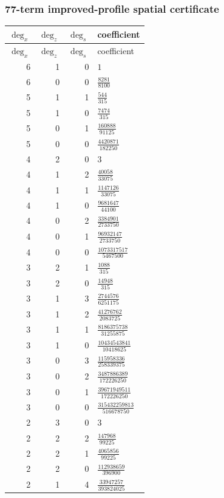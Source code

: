\subsubsection*{77-term improved-profile spatial certificate}
\begin{longtable}{rrrl}
$\deg_{x}$ & $\deg_{z}$ & $\deg_{s}$ & coefficient\\
\toprule
\endfirsthead
$\deg_{x}$ & $\deg_{z}$ & $\deg_{s}$ & coefficient\\
\toprule
\endhead
6 & 1 & 0 & $1$\\
6 & 0 & 0 & $\frac{8281}{8100}$\\
5 & 1 & 1 & $\frac{544}{315}$\\
5 & 1 & 0 & $\frac{7474}{315}$\\
5 & 0 & 1 & $\frac{160888}{91125}$\\
5 & 0 & 0 & $\frac{4420871}{182250}$\\
4 & 2 & 0 & $3$\\
4 & 1 & 2 & $\frac{40058}{33075}$\\
4 & 1 & 1 & $\frac{1147126}{33075}$\\
4 & 1 & 0 & $\frac{9681647}{44100}$\\
4 & 0 & 2 & $\frac{3384901}{2733750}$\\
4 & 0 & 1 & $\frac{96932147}{2733750}$\\
4 & 0 & 0 & $\frac{1073317517}{5467500}$\\
3 & 2 & 1 & $\frac{1088}{315}$\\
3 & 2 & 0 & $\frac{14948}{315}$\\
3 & 1 & 3 & $\frac{2744576}{6251175}$\\
3 & 1 & 2 & $\frac{41276762}{2083725}$\\
3 & 1 & 1 & $\frac{8186375738}{31255875}$\\
3 & 1 & 0 & $\frac{10434543841}{10418625}$\\
3 & 0 & 3 & $\frac{115958336}{258339375}$\\
3 & 0 & 2 & $\frac{3487886389}{172226250}$\\
3 & 0 & 1 & $\frac{39671949511}{172226250}$\\
3 & 0 & 0 & $\frac{315432259813}{516678750}$\\
2 & 3 & 0 & $3$\\
2 & 2 & 2 & $\frac{147968}{99225}$\\
2 & 2 & 1 & $\frac{4065856}{99225}$\\
2 & 2 & 0 & $\frac{112938659}{396900}$\\
2 & 1 & 4 & $\frac{33947257}{393824025}$\\

\end{longtable}

